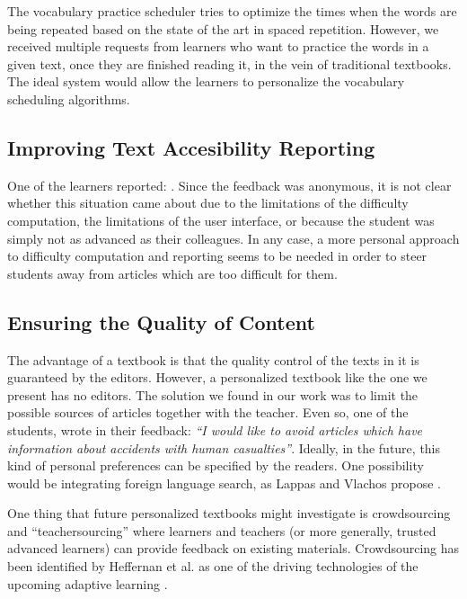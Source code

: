 The vocabulary practice scheduler tries to optimize the times when the words are being repeated based on the state of the art in spaced repetition. However, we received multiple requests from learners who want to practice the words in a given text, once they are finished reading it, in the vein of traditional textbooks. The ideal system would allow the learners to personalize the vocabulary scheduling algorithms. 


\subsection{Improving Text Accesibility Reporting}
One of the learners reported: . Since the feedback was anonymous, it is not clear whether this situation came about due to the limitations of the difficulty computation, the limitations of the user interface, or because the student was simply not as advanced as their colleagues. In any case, a more personal approach to difficulty computation and reporting seems to be needed in order to steer students away from articles which are too difficult for them. 


\subsection{Ensuring the Quality of Content}
The advantage of a textbook is that the quality control of the texts in it is guaranteed by the editors. However, a personalized textbook like the one we present has no editors. The solution we found in our work was to limit the possible sources of articles together with the teacher. Even so, one of the students, wrote in their feedback: {\em ``I would like to avoid articles which have information about accidents with human casualties''}. Ideally, in the future, this kind of personal preferences can be specified by the readers. One possibility would be integrating  foreign language search, as Lappas and Vlachos propose \cite{Lapp12-NonNative}.

One thing that future personalized textbooks might investigate is crowdsourcing and ``teachersourcing'' where learners and teachers (or more generally, trusted advanced learners) can provide feedback on existing materials. Crowdsourcing has been identified by Heffernan et al. as one of the driving technologies of the upcoming adaptive learning \cite{Heff16-crowdsourcing}. 

